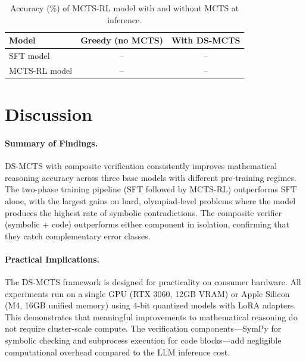 \documentclass[11pt,a4paper]{article}
\begin{document}
\begin{table}[h]
\centering
\caption{Accuracy (\%) of MCTS-RL model with and without MCTS at inference.}
\label{tab:transfer}
\begin{tabular}{lcc}
\toprule
\textbf{Model} & \textbf{Greedy (no MCTS)} & \textbf{With DS-MCTS} \\
\midrule
SFT model     & -- & -- \\
MCTS-RL model & -- & -- \\
\bottomrule
\end{tabular}
\end{table}



\section{Discussion}
\label{sec:discussion}

\paragraph{Summary of Findings.}
DS-MCTS with composite verification consistently improves mathematical
reasoning accuracy across three base models with different pre-training
regimes. The two-phase training pipeline (SFT followed by MCTS-RL) outperforms
SFT alone, with the largest gains on hard, olympiad-level problems where the
model produces the highest rate of symbolic contradictions. The composite
verifier (symbolic + code) outperforms either component in isolation,
confirming that they catch complementary error classes.

\paragraph{Practical Implications.}
The DS-MCTS framework is designed for practicality on consumer hardware. All
experiments run on a single GPU (RTX 3060, 12GB VRAM) or Apple Silicon (M4,
16GB unified memory) using 4-bit quantized models with LoRA adapters. This
demonstrates that meaningful improvements to mathematical reasoning do not
require cluster-scale compute. The verification components---SymPy for symbolic
checking and subprocess execution for code blocks---add negligible computational
overhead compared to the LLM inference cost.
\end{document}
